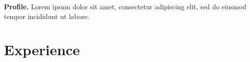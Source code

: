\documentclass{vitae}
\begin{document}
\begin{masthead}
  \textbf{Profile.} Lorem ipsum dolor sit amet, consectetur
  adipiscing elit, sed do eiusmod tempor incididunt ut labore.
\end{masthead}
\section{Experience}
\end{document}
